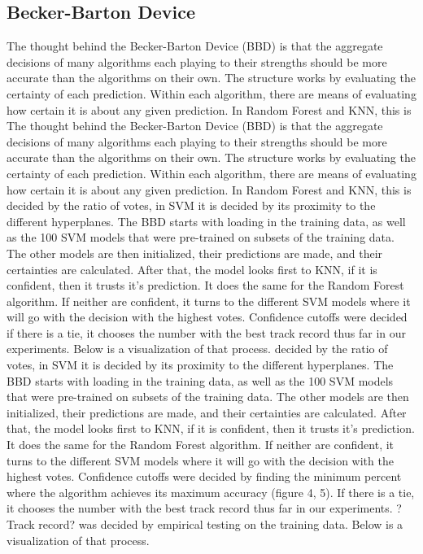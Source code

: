 \documentclass[11pt, oneside]{article}   	%
\begin{document}
\subsection{Becker-Barton Device}
The thought behind the Becker-Barton Device (BBD) is that the aggregate decisions of many algorithms each playing to their strengths should be more accurate than the algorithms on their own. The structure works by evaluating the certainty of each prediction. Within each algorithm, there are means of evaluating how certain it is about any given prediction. In Random Forest and KNN, this is The thought behind the Becker-Barton Device (BBD) is that the aggregate decisions of many algorithms each playing to their strengths should be more accurate than the algorithms on their own. The structure works by evaluating the certainty of each prediction. Within each algorithm, there are means of evaluating how certain it is about any given prediction. In Random Forest and KNN, this is decided by the ratio of votes, in SVM it is decided by its proximity to the different hyperplanes. The BBD starts with loading in the training data, as well as the 100 SVM models that were pre-trained on subsets of the training data. The other models are then initialized, their predictions are made, and their certainties are calculated. After that, the model looks first to KNN, if it is confident, then it trusts it's prediction. It does the same for the Random Forest algorithm. If neither are confident, it turns to the different SVM models where it will go with the decision with the highest votes. Confidence cutoffs were decided  if there is a tie, it chooses the number with the best track record thus far in our experiments. Below is a visualization of that process. decided by the ratio of votes, in SVM it is decided by its proximity to the different hyperplanes. The BBD starts with loading in the training data, as well as the 100 SVM models that were pre-trained on subsets of the training data. The other models are then initialized, their predictions are made, and their certainties are calculated. After that, the model looks first to KNN, if it is confident, then it trusts it's prediction. It does the same for the Random Forest algorithm. If neither are confident, it turns to the different SVM models where it will go with the decision with the highest votes. Confidence cutoffs were decided by finding the minimum percent where the algorithm achieves its maximum accuracy (figure 4, 5). If there is a tie, it chooses the number with the best track record thus far in our experiments. ?Track record? was decided by empirical testing on the training data. Below is a visualization of that process. 
\end{document}
